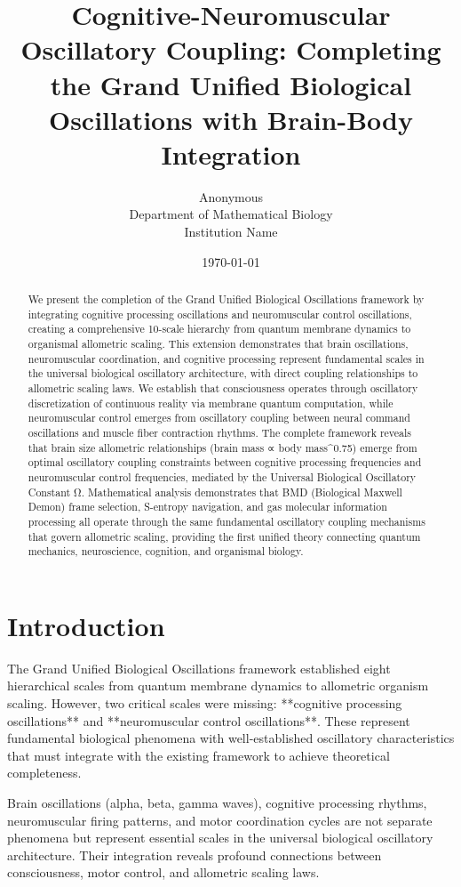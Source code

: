 \documentclass[twocolumn]{article}
\title{Cognitive-Neuromuscular Oscillatory Coupling: Completing the Grand Unified Biological Oscillations with Brain-Body Integration}
\author{
Anonymous\\
Department of Mathematical Biology\\
Institution Name
}
\date{\today}
\begin{document}
\maketitle

\begin{abstract}
We present the completion of the Grand Unified Biological Oscillations framework by integrating cognitive processing oscillations and neuromuscular control oscillations, creating a comprehensive 10-scale hierarchy from quantum membrane dynamics to organismal allometric scaling. This extension demonstrates that brain oscillations, neuromuscular coordination, and cognitive processing represent fundamental scales in the universal biological oscillatory architecture, with direct coupling relationships to allometric scaling laws. We establish that consciousness operates through oscillatory discretization of continuous reality via membrane quantum computation, while neuromuscular control emerges from oscillatory coupling between neural command oscillations and muscle fiber contraction rhythms. The complete framework reveals that brain size allometric relationships (brain mass ∝ body mass^0.75) emerge from optimal oscillatory coupling constraints between cognitive processing frequencies and neuromuscular control frequencies, mediated by the Universal Biological Oscillatory Constant Ω. Mathematical analysis demonstrates that BMD (Biological Maxwell Demon) frame selection, S-entropy navigation, and gas molecular information processing all operate through the same fundamental oscillatory coupling mechanisms that govern allometric scaling, providing the first unified theory connecting quantum mechanics, neuroscience, cognition, and organismal biology.
\end{abstract}

\section{Introduction}

The Grand Unified Biological Oscillations framework established eight hierarchical scales from quantum membrane dynamics to allometric organism scaling. However, two critical scales were missing: **cognitive processing oscillations** and **neuromuscular control oscillations**. These represent fundamental biological phenomena with well-established oscillatory characteristics that must integrate with the existing framework to achieve theoretical completeness.

Brain oscillations (alpha, beta, gamma waves), cognitive processing rhythms, neuromuscular firing patterns, and motor coordination cycles are not separate phenomena but represent essential scales in the universal biological oscillatory architecture. Their integration reveals profound connections between consciousness, motor control, and allometric scaling laws.
\end{document}
